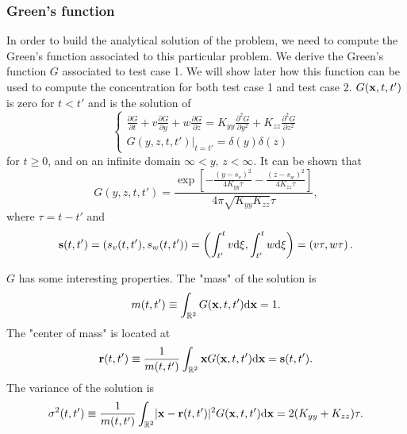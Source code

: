 \subsubsection{Green's function}
In order to build the analytical solution of the problem, we need to compute the Green's function associated to this particular problem. We derive the Green's function $G$ associated to test case 1. We will show later how this function can be used to compute the concentration for both test case 1 and test case 2. $\G$ is zero for $t<t'$ and is the solution of
\begin{equation} \label{eq:testcase_green}
	\begin{cases}
		\frac{\partial G}{\partial t} + v \frac{\partial G}{\partial y} + w\frac{\partial G}{\partial z} = K_{yy}\frac{\partial^2 G}{\partial y^2} + K_{zz}\frac{\partial^2 G}{\partial z^2}\\[.1cm]
		\left. G(y,z,t,t') \right \rvert_{t=t'} = \delta(y)\delta(z) 
	\end{cases}
\end{equation}
for $t \ge 0$, and on an infinite domain $\infty < y,\, z < \infty$. It can be shown that
\begin{equation} 
	G(y,z,t,t') = \frac{\exp\left[-\frac{(y-s_v)^2}{4K_{yy}\tau} -\frac{(z-s_w)^2}{4K_{zz}\tau} \right]}{4\pi\sqrt{K_{yy}K_{zz}}\tau},
\end{equation}
where $\tau = t-t'$ and 
\begin{equation}
	\b s(t,t') = (s_v(t,t'), s_w(t,t')) = \left(\int_{t'}^{t}v \rm d \xi, \int_{t'}^{t}w \rm d \xi \right) = \left(v\tau, w\tau\right).
\end{equation}

$G$ has some interesting properties. The "mass" of the solution is
\begin{equation} \label{eq:testcase:propmass}
	m(t,t') \equiv \int_{\R[2]} \G \rm d \b x = 1.
\end{equation}
The "center of mass" is located at
\begin{equation} \label{eq:testcase:propcenter}
	\b r(t,t') \equiv \frac{1}{m(t,t')} \int_{\R[2]} \b x \G \rm d \b x  = \b s(t,t').
\end{equation}
The variance of the solution is
\begin{equation} \label{eq:testcase:propvar}
	\sigma^2(t,t') \equiv \frac{1}{m(t,t')} \int_{\R[2]} \lvert \b x - \b r(t,t') \rvert^2 \G \rm d \b x = 2 (K_{yy}+K_{zz}) \tau.
\end{equation}

